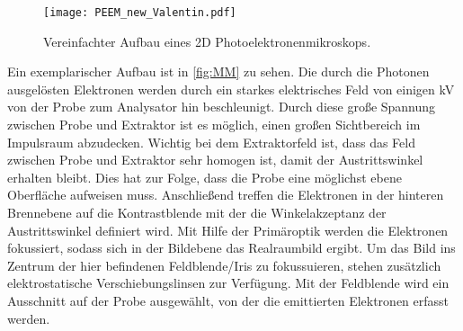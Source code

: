         \begin{figure}
            \centering
            \texttt{[image: PEEM\_new\_Valentin.pdf]}
            \caption{Vereinfachter Aufbau eines 2D Photoelektronenmikroskops.} 
            \label{fig:MM}
        \end{figure}
        Ein exemplarischer Aufbau ist in \autoref{fig:MM} zu sehen.
        Die durch die Photonen ausgelösten Elektronen werden durch ein starkes elektrisches Feld von einigen \si{\kilo\volt} von der Probe zum Analysator hin beschleunigt.
        Durch diese große Spannung zwischen Probe und Extraktor ist es möglich, einen großen Sichtbereich im Impulsraum abzudecken.
        Wichtig bei dem Extraktorfeld ist, dass das Feld zwischen Probe und Extraktor sehr homogen ist, damit der Austrittswinkel erhalten bleibt.
        Dies hat zur Folge, dass die Probe eine möglichst ebene Oberfläche aufweisen muss.
        Anschließend treffen die Elektronen in der hinteren Brennebene auf die Kontrastblende mit der die Winkelakzeptanz der Austrittswinkel definiert wird.
        Mit Hilfe der Primäroptik werden die Elektronen fokussiert, sodass sich in der Bildebene das Realraumbild ergibt.
        Um das Bild ins Zentrum der hier befindenen Feldblende/Iris zu fokussuieren, stehen zusätzlich elektrostatische Verschiebungslinsen zur Verfügung.
        Mit der Feldblende wird ein Ausschnitt auf der Probe ausgewählt, von der die emittierten Elektronen erfasst werden.

